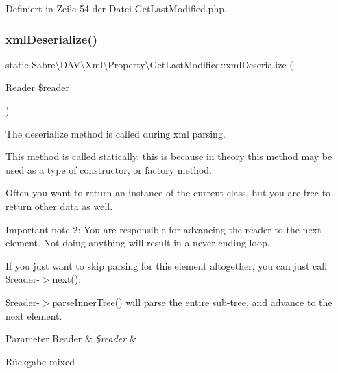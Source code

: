 Definiert in Zeile 54 der Datei Get\+Last\+Modified.\+php.

\mbox{\label{class_sabre_1_1_d_a_v_1_1_xml_1_1_property_1_1_get_last_modified_a0856e52c758cb1bc236b65540005977e}} 
\subsubsection{\texorpdfstring{xml\+Deserialize()}{xmlDeserialize()}}
{\footnotesize\ttfamily static Sabre\textbackslash{}\+D\+A\+V\textbackslash{}\+Xml\textbackslash{}\+Property\textbackslash{}\+Get\+Last\+Modified\+::xml\+Deserialize (\begin{DoxyParamCaption}\item[{\mbox{\hyperlink{class_sabre_1_1_xml_1_1_reader}{Reader}}}]{\$reader }\end{DoxyParamCaption})\hspace{0.3cm}{\ttfamily [static]}}

The deserialize method is called during xml parsing.

This method is called statically, this is because in theory this method may be used as a type of constructor, or factory method.

Often you want to return an instance of the current class, but you are free to return other data as well.

Important note 2\+: You are responsible for advancing the reader to the next element. Not doing anything will result in a never-\/ending loop.

If you just want to skip parsing for this element altogether, you can just call \$reader-\/$>$next();

\$reader-\/$>$parse\+Inner\+Tree() will parse the entire sub-\/tree, and advance to the next element.


\begin{DoxyParams}[1]{Parameter}
Reader & {\em \$reader} & \\
\hline
\end{DoxyParams}
\begin{DoxyReturn}{Rückgabe}
mixed 
\end{DoxyReturn}


